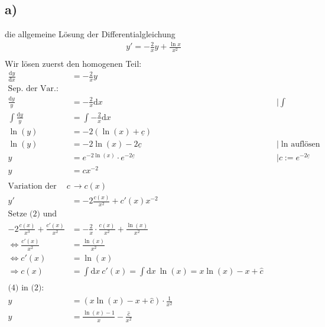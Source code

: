 \documentclass{theozettel}
\begin{document}
\subsection*{a)}die allgemeine Lösung der Differentialgleichung
\begin{align*}
y'=-\frac{2}{x}y+\frac{\ln x}{x^2}\tag*{(1)}\\
\end{align*}
Wir lösen zuerst den homogenen Teil:
\begin{align*}
\frac{\text{d}y}{\text{d}x}&=-\frac{2}{x}y\\
\text{Sep. der Var.:}\\
\frac{\text{d}y}{y}&=-\frac{2}{x}\text{d}x&&|\int\\
\int\frac{\text{d}y}{y}&=\int-\frac{2}{x}\text{d}x\\
\ln\left(y\right)&=-2\left(\ln\left(x\right)+\underline{c}\right)\\
\ln\left(y\right)&=-2\ln\left(x\right)-2\underline{c}&&|\text{$\ln$ auflösen}\\
y&=e^{-2\ln\left(x\right)}\cdot e^{-2\underline{c}}&&|c:=e^{-2\underline{c}}\\
y&=cx^{-2}\tag*{(2)}\\\\
\text{Variation der Kons.:} \ c&\rightarrow c\left(x\right)\\
y'&=-2\frac{c\left(x\right)}{x^2}+c'\left(x\right)x^{-2}\tag*{(3)}\\
\text{Setze (2) und (3) in (1) ein:}\\
-2\frac{c\left(x\right)}{x^3}+\frac{c'\left(x\right)}{x^2}&=-\frac{2}{x}\cdot\frac{c\left(x\right)}{x^2}+\frac{\ln\left(x\right)}{x^2}\\
\Leftrightarrow \frac{c'\left(x\right)}{x^2}&=\frac{\ln\left(x\right)}{x^2}\\
\Leftrightarrow c'\left(x\right)&=\ln\left(x\right)\\
\Rightarrow c\left(x\right)&=\int\text{d}x \ c'\left(x\right) =\int\text{d}x \ \ln\left(x\right)=x\ln\left(x\right)-x+\hat{c} \tag*{(4)}\\\\
\text{(4) in (2):}\\
y&=\left(x\ln\left(x\right)-x+\hat{c}\right)\cdot \frac{1}{x^2}\\
y&=\frac{\ln\left(x\right)-1}{x}-\frac{\hat{c}}{x^2}
\end{align*}
\newpage
\end{document}
